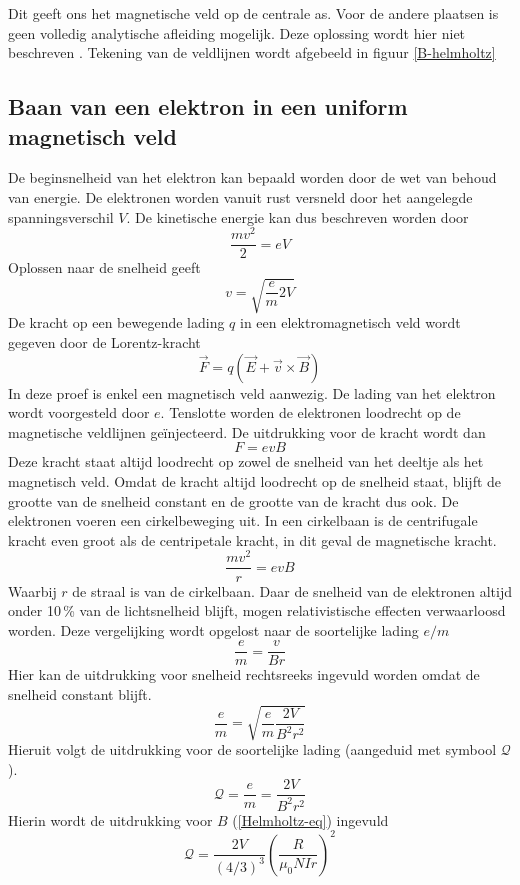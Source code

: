 Dit geeft ons het magnetische veld op de centrale as. Voor de andere plaatsen 
is geen volledig analytische afleiding mogelijk. Deze oplossing wordt hier niet 
beschreven \cite{magnVeldHelmholtz}.
Tekening van de veldlijnen wordt afgebeeld in figuur \ref{B-helmholtz}


\subsection{Baan van een elektron in een uniform magnetisch veld}

De beginsnelheid van het elektron kan bepaald worden door de wet van behoud van 
energie. De elektronen worden vanuit rust versneld door het aangelegde 
spanningsverschil $V$. De kinetische energie kan dus beschreven worden door
$$
\frac{mv^2}{2} = eV
$$
Oplossen naar de snelheid geeft
$$
v = \sqrt{ \frac{e}{m} 2V }
$$
De kracht op een bewegende lading $q$ in een elektromagnetisch veld wordt 
gegeven door de Lorentz-kracht
$$
\vec{F} = q(\vec{E} + \vec{v} \times \vec{B})
$$
In deze proef is enkel een magnetisch veld aanwezig. De lading van het elektron 
wordt voorgesteld door $e$. Tenslotte worden de elektronen loodrecht op de 
magnetische veldlijnen ge\"injecteerd. De uitdrukking voor de kracht wordt dan
$$
F = e v B
$$
Deze kracht staat altijd loodrecht op zowel de snelheid van het deeltje als het 
magnetisch veld. Omdat de kracht altijd loodrecht op de snelheid staat, blijft 
de grootte van de snelheid constant en de grootte van de kracht dus ook. De 
elektronen voeren een cirkelbeweging uit. In een cirkelbaan is de centrifugale 
kracht even groot als de centripetale kracht, in dit geval de magnetische 
kracht.
$$
\frac{mv^2}{r} = evB
$$
Waarbij $r$ de straal is van de cirkelbaan.
Daar de snelheid van de elektronen altijd onder 10\,\% van de lichtsnelheid 
blijft, mogen relativistische effecten verwaarloosd worden. Deze vergelijking 
wordt opgelost naar de soortelijke lading $e/m$
$$
\frac{e}{m} = \frac{v}{Br}
$$
Hier kan de uitdrukking voor snelheid rechtsreeks ingevuld worden omdat de 
snelheid constant blijft.
$$
\frac{e}{m} = \sqrt{\frac{e}{m} \frac{2V}{B^2r^2}}
$$
Hieruit volgt de uitdrukking voor de soortelijke lading (aangeduid met symbool 
$\mathcal{Q}$).
$$
\mathcal{Q} = \frac{e}{m} = \frac{2V}{B^2r^2}
$$
Hierin wordt de uitdrukking voor $B$ (\ref{Helmholtz-eq}) ingevuld
\begin{equation}
\mathcal{Q} = \frac{2V}{(4/3)^3} \left( \frac{R}{\mu_0NIr} \right)^2
\end{equation}
